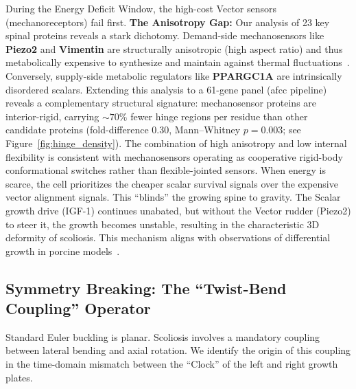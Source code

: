 During the Energy Deficit Window, the high-cost Vector sensors (mechanoreceptors) fail first.
\textbf{The Anisotropy Gap:} Our analysis of 23 key spinal proteins reveals a stark dichotomy. Demand-side mechanosensors like \textbf{Piezo2} and \textbf{Vimentin} are structurally anisotropic (high aspect ratio) and thus metabolically expensive to synthesize and maintain against thermal fluctuations~\cite{lynch2015bioenergetic}. Conversely, supply-side metabolic regulators like \textbf{PPARGC1A} are intrinsically disordered scalars. Extending this analysis to a 61-gene panel (afcc pipeline) reveals a complementary structural signature: mechanosensor proteins are interior-rigid, carrying $\sim 70\%$ fewer hinge regions per residue than other candidate proteins (fold-difference $0.30$, Mann--Whitney $p = 0.003$; see Figure~\ref{fig:hinge_density}). The combination of high anisotropy and low internal flexibility is consistent with mechanosensors operating as cooperative rigid-body conformational switches rather than flexible-jointed sensors.
When energy is scarce, the cell prioritizes the cheaper scalar survival signals over the expensive vector alignment signals. This ``blinds'' the growing spine to gravity. The Scalar growth drive (IGF-1) continues unabated, but without the Vector rudder (Piezo2) to steer it, the growth becomes unstable, resulting in the characteristic 3D deformity of scoliosis. This mechanism aligns with observations of differential growth in porcine models~\cite{newton2005differential}.

\subsection{Symmetry Breaking: The ``Twist-Bend Coupling'' Operator}

Standard Euler buckling is planar. Scoliosis involves a mandatory coupling between lateral bending and axial rotation. We identify the origin of this coupling in the time-domain mismatch between the ``Clock'' of the left and right growth plates.

